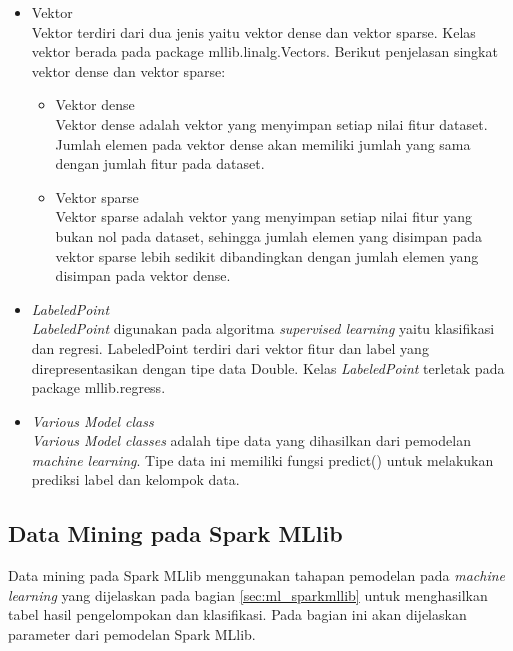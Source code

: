 \begin{itemize}
\item Vektor\\
Vektor terdiri dari dua jenis yaitu vektor dense dan vektor sparse. Kelas vektor berada pada package mllib.linalg.Vectors. Berikut penjelasan singkat vektor dense dan vektor sparse:

\begin{itemize}

\item Vektor dense\\
Vektor dense adalah vektor yang menyimpan setiap nilai fitur dataset. Jumlah elemen pada vektor dense akan memiliki jumlah yang sama dengan jumlah fitur pada dataset. \\

\item Vektor sparse\\
Vektor sparse adalah vektor yang menyimpan setiap nilai fitur yang bukan nol pada dataset, sehingga jumlah elemen yang disimpan pada vektor sparse lebih sedikit dibandingkan dengan jumlah elemen yang disimpan pada vektor dense. 

\end{itemize}

\item \textit{LabeledPoint}\\
\textit{LabeledPoint} digunakan pada algoritma \textit{supervised learning} yaitu klasifikasi dan regresi. LabeledPoint terdiri dari vektor fitur dan label yang direpresentasikan dengan tipe data Double. Kelas \textit{LabeledPoint} terletak pada package mllib.regress.

\item \textit{Various Model class}\\
\textit{Various Model classes} adalah tipe data yang dihasilkan dari pemodelan \textit{machine learning}. Tipe data ini memiliki fungsi predict() untuk melakukan prediksi label dan kelompok data.

\end{itemize}

\subsection{Data Mining pada Spark MLlib}
Data mining pada Spark MLlib menggunakan tahapan pemodelan pada \textit{machine learning} yang dijelaskan pada bagian \ref{sec:ml_sparkmllib} untuk menghasilkan tabel hasil pengelompokan dan klasifikasi. Pada bagian ini akan dijelaskan parameter dari pemodelan Spark MLlib.

